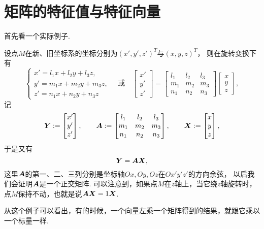 \section{矩阵的特征值与特征向量}
首先看一个实际例子.
\begin{example}
设点\(M\)在新、旧坐标系的坐标分别为\((x',y',z')^T\)与\((x,y,z)^T\)，
则在旋转变换下有\[
	\left\{ \begin{array}{l}
		x' = l_1 x + l_2 y + l_3 z, \\
		y' = m_1 x + m_2 y + m_3 z, \\
		z' = n_1 x + n_2 y + n_3 z
	\end{array} \right.
	\quad\text{或}\quad
	\begin{bmatrix}
		x' \\ y' \\ z'
	\end{bmatrix}
	= \begin{bmatrix}
		l_1 & l_2 & l_3 \\
		m_1 & m_2 & m_3 \\
		n_1 & n_2 & n_3
	\end{bmatrix}
	\begin{bmatrix}
		x \\ y \\ z
	\end{bmatrix},
\]
记\[
	\boldsymbol{Y} := \begin{bmatrix}
		x' \\ y' \\ z'
	\end{bmatrix},
	\qquad
	\boldsymbol{A} := \begin{bmatrix}
		l_1 & l_2 & l_3 \\
		m_1 & m_2 & m_3 \\
		n_1 & n_2 & n_3
	\end{bmatrix},
	\qquad
	\boldsymbol{X} := \begin{bmatrix}
		x \\ y \\ z
	\end{bmatrix},
\]
于是又有\[
	\boldsymbol{Y}=\boldsymbol{A}\boldsymbol{X},
\]
这里\(\boldsymbol{A}\)的第一、二、三列分别是坐标轴\(Ox,Oy,Oz\)在\(Ox'y'z'\)的方向余弦，
以后我们会证明\(\boldsymbol{A}\)是一个正交矩阵.
可以注意到，如果点\(M\)在\(z\)轴上，当它绕\(z\)轴旋转时，
点\(M\)保持不动，也就是说\(\boldsymbol{A}\boldsymbol{X}=1\boldsymbol{X}\).
\end{example}
从这个例子可以看出，有的时候，一个向量左乘一个矩阵得到的结果，就跟它乘以一个标量一样.

